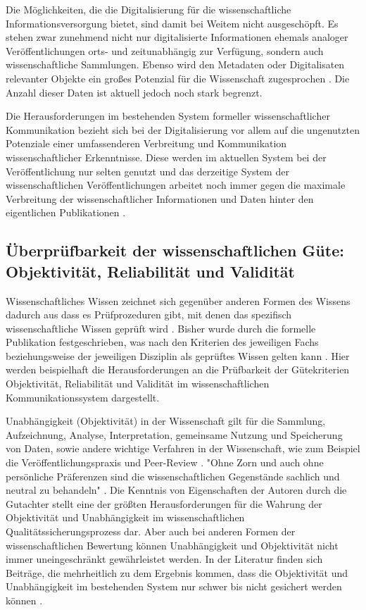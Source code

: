 Die Möglichkeiten, die die Digitalisierung für die wissenschaftliche Informationsversorgung bietet, sind damit bei Weitem nicht ausgeschöpft. Es stehen zwar zunehmend nicht nur digitalisierte Informationen ehemals analoger Veröffentlichungen orts- und zeitunabhängig zur Verfügung, sondern auch wissenschaftliche Sammlungen. Ebenso wird den Metadaten oder Digitalisaten relevanter Objekte ein großes Potenzial für die Wissenschaft zugesprochen \cite{Winkler_2011}. Die Anzahl dieser Daten ist aktuell jedoch noch stark begrenzt.

Die Herausforderungen im bestehenden System formeller wissenschaftlicher Kommunikation bezieht sich bei der Digitalisierung vor allem auf die ungenutzten Potenziale einer umfassenderen Verbreitung und Kommunikation wissenschaftlicher Erkenntnisse. Diese werden im aktuellen System bei der Veröffentlichung nur selten genutzt und das derzeitige System der wissenschaftlichen Veröffentlichungen arbeitet noch immer gegen die maximale Verbreitung der wissenschaftlicher Informationen und Daten hinter den eigentlichen Publikationen \cite{Molloy_2011}.

\subsection{Überprüfbarkeit der wissenschaftlichen Güte: Objektivität, Reliabilität und Validität}

Wissenschaftliches Wissen zeichnet sich gegenüber anderen Formen des Wissens dadurch aus dass es Prüfprozeduren gibt, mit denen das spezifisch wissenschaftliche Wissen geprüft wird \cite{Luhmann_1998}. Bisher wurde durch die formelle Publikation festgeschrieben, was nach den Kriterien des jeweiligen Fachs beziehungsweise der jeweiligen Disziplin als geprüftes Wissen gelten kann \cite[:11]{BBAW_2015}. Hier werden beispielhaft die Herausforderungen an die Prüfbarkeit der Gütekriterien Objektivität, Reliabilität und Validität im wissenschaftlichen  Kommunikationssystem dargestellt.

Unabhängigkeit (Objektivität) in der Wissenschaft gilt für die Sammlung, Aufzeichnung, Analyse, Interpretation, gemeinsame Nutzung und Speicherung von Daten, sowie andere wichtige Verfahren in der Wissenschaft, wie zum Beispiel die Veröffentlichungspraxis und Peer-Review \cite{Resnik_2005}. "Ohne Zorn und auch ohne persönliche Präferenzen sind die wissenschaftlichen Gegenstände sachlich und neutral zu behandeln" \cite[:9]{Gruber_2005}. Die Kenntnis von Eigenschaften der Autoren durch die Gutachter stellt eine der größten Herausforderungen für die Wahrung der Objektivität und Unabhängigkeit im wissenschaftlichen Qualitätssicherungsprozess dar. Aber auch bei anderen Formen der wissenschaftlichen Bewertung können Unabhängigkeit und Objektivität nicht immer uneingeschränkt gewährleistet werden. In der Literatur finden sich Beiträge, die mehrheitlich zu dem Ergebnis kommen, dass die Objektivität und Unabhängigkeit im bestehenden System nur schwer bis nicht gesichert werden können \cite{Binswanger_2014}.

